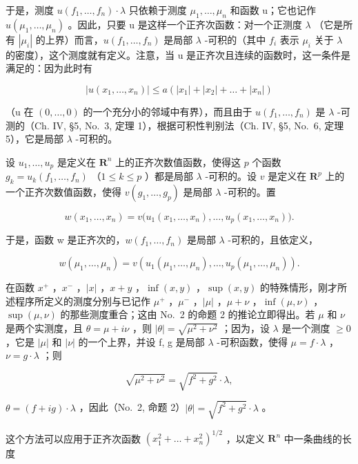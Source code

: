 于是，测度 \(u(f_{1},\ldots,f_{n})\cdot\lambda\) 只依赖于测度 \(\mu_{1},\ldots,\mu_{n}\) 和函数 u；它也记作 \(u(\mu_{1},\ldots,\mu_{n})\) 。因此，只要 u 是这样一个正齐次函数：对一个正测度 \(\lambda\) （它是所有 \(|\mu_{i}|\) 的上界）而言，\(u(f_{1},\ldots,f_{n})\) 是局部 \(\lambda\) -可积的（其中 \(f_{i}\) 表示 \(\mu_{i}\) 关于 \(\lambda\) 的密度），这个测度就有定义。注意，当 u 是正齐次且连续的函数时，这一条件是满足的：因为此时有

\[
\left| u \left(x _ {1}, \dots , x _ {n}\right) \right| \leqslant a \left(\left| x _ {1} \right| + \left| x _ {2} \right| + \dots + \left| x _ {n} \right|\right)
\]

（u 在 \((0,\ldots,0)\) 的一个充分小的邻域中有界），而且由于 \(u(f_{1},\ldots,f_{n})\) 是 \(\lambda\) -可测的（Ch. IV, §5, No.~3, 定理 1），根据可积性判别法（Ch. IV, §5, No.~6, 定理 5），它是局部 \(\lambda\) -可积的。

设 \(u_1, \ldots, u_p\) 是定义在 \(\mathbf{R}^n\) 上的正齐次数值函数，使得这 \(p\) 个函数 \(g_k = u_k(f_1, \ldots, f_n)\) （\(1 \leqslant k \leqslant p\) ）都是局部 \(\lambda\) -可积的。设 \(v\) 是定义在 \(\mathbf{R}^p\) 上的一个正齐次数值函数，使得 \(v(g_1, \ldots, g_p)\) 是局部 \(\lambda\) -可积的。置

\[
w (x _ {1}, \ldots , x _ {n}) = v \big (u _ {1} (x _ {1}, \ldots , x _ {n}), \ldots , u _ {p} (x _ {1}, \ldots , x _ {n}) \big).
\]

于是，函数 w 是正齐次的，\(w(f_{1}, \ldots, f_{n})\) 是局部 \(\lambda\) -可积的，且依定义，

\[
w \left(\mu_ {1}, \dots , \mu_ {n}\right) = v \left(u _ {1} \left(\mu_ {1}, \dots , \mu_ {n}\right), \dots , u _ {p} \left(\mu_ {1}, \dots , \mu_ {n}\right)\right).
\]

在函数 \(x^{+}\) ，\(x^{-}\) ，\(|x|\) ，\(x + y\) ，\(\inf(x, y)\) ，\(\sup(x, y)\) 的特殊情形，刚才所述程序所定义的测度分别与已记作 \(\mu^{+}\) ，\(\mu^{-}\) ，\(|\mu|\) ，\(\mu + \nu\) ，\(\inf(\mu, \nu)\) ，\(\sup(\mu, \nu)\) 的那些测度重合；这由 No.~2 的命题 2 的推论立即得出。若 \(\mu\) 和 \(\nu\) 是两个实测度，且 \(\theta = \mu + i\nu\) ，则 \(|\theta| = \sqrt{\mu^{2} + \nu^{2}}\) ；因为，设 \(\lambda\) 是一个测度 \(\geqslant 0\) ，它是 \(|\mu|\) 和 \(|\nu|\) 的一个上界，并设 f, g 是局部 \(\lambda\) -可积函数，使得 \(\mu = f \cdot \lambda\) ，\(\nu = g \cdot \lambda\) ；则

\[
\sqrt {\mu^ {2} + \nu^ {2}} = \sqrt {f ^ {2} + g ^ {2}} \cdot \lambda ,
\]

\(\theta = (f + ig) \cdot \lambda\) ，因此（No.~2, 命题 2）\(|\theta| = \sqrt{f^2 + g^2} \cdot \lambda\) 。

这个方法可以应用于正齐次函数 \((x_1^2 +\ldots +x_n^2)^{1 / 2}\) ，以定义 \(\mathbf{R}^n\) 中一条曲线的长度

